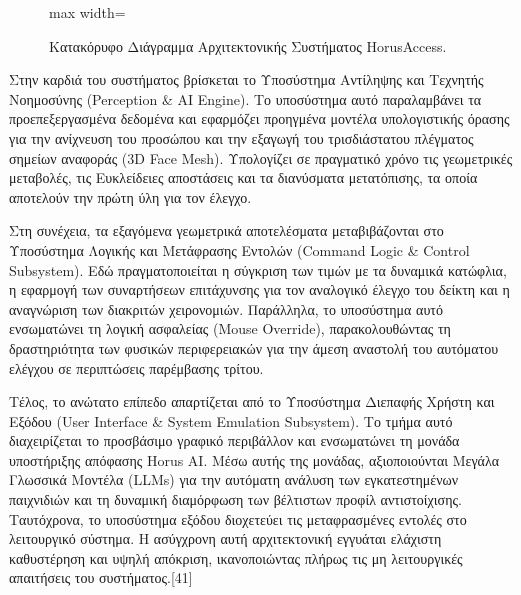 \documentclass[twoside, a4paper, 11pt]{article}
\begin{document}
\begin{figure}[H]
\begin{adjustbox}{max width=\textwidth}
    \end{adjustbox}
    \caption{Κατακόρυφο Διάγραμμα Αρχιτεκτονικής Συστήματος HorusAccess.}
\end{figure}

Στην καρδιά του συστήματος βρίσκεται το Υποσύστημα Αντίληψης και Τεχνητής Νοημοσύνης (Perception \& AI Engine). Το υποσύστημα αυτό παραλαμβάνει τα προεπεξεργασμένα δεδομένα και εφαρμόζει προηγμένα μοντέλα υπολογιστικής όρασης για την ανίχνευση του προσώπου και την εξαγωγή του τρισδιάστατου πλέγματος σημείων αναφοράς (3D Face Mesh). Υπολογίζει σε πραγματικό χρόνο τις γεωμετρικές μεταβολές, τις Ευκλείδειες αποστάσεις και τα διανύσματα μετατόπισης, τα οποία αποτελούν την πρώτη ύλη για τον έλεγχο.

Στη συνέχεια, τα εξαγόμενα γεωμετρικά αποτελέσματα μεταβιβάζονται στο Υποσύστημα Λογικής και Μετάφρασης Εντολών (Command Logic \& Control Subsystem). Εδώ πραγματοποιείται η σύγκριση των τιμών με τα δυναμικά κατώφλια, η εφαρμογή των συναρτήσεων επιτάχυνσης για τον αναλογικό έλεγχο του δείκτη και η αναγνώριση των διακριτών χειρονομιών. Παράλληλα, το υποσύστημα αυτό ενσωματώνει τη λογική ασφαλείας (Mouse Override), παρακολουθώντας τη δραστηριότητα των φυσικών περιφερειακών για την άμεση αναστολή του αυτόματου ελέγχου σε περιπτώσεις παρέμβασης τρίτου.

Τέλος, το ανώτατο επίπεδο απαρτίζεται από το Υποσύστημα Διεπαφής Χρήστη και Εξόδου (User Interface \& System Emulation Subsystem). Το τμήμα αυτό διαχειρίζεται το προσβάσιμο γραφικό περιβάλλον και ενσωματώνει τη μονάδα υποστήριξης απόφασης Horus AI. Μέσω αυτής της μονάδας, αξιοποιούνται Μεγάλα Γλωσσικά Μοντέλα (LLMs) για την αυτόματη ανάλυση των εγκατεστημένων παιχνιδιών και τη δυναμική διαμόρφωση των βέλτιστων προφίλ αντιστοίχισης. Ταυτόχρονα, το υποσύστημα εξόδου διοχετεύει τις μεταφρασμένες εντολές στο λειτουργικό σύστημα. Η ασύγχρονη αυτή αρχιτεκτονική εγγυάται ελάχιστη καθυστέρηση και υψηλή απόκριση, ικανοποιώντας πλήρως τις μη λειτουργικές απαιτήσεις του συστήματος.[41]
\end{document}

